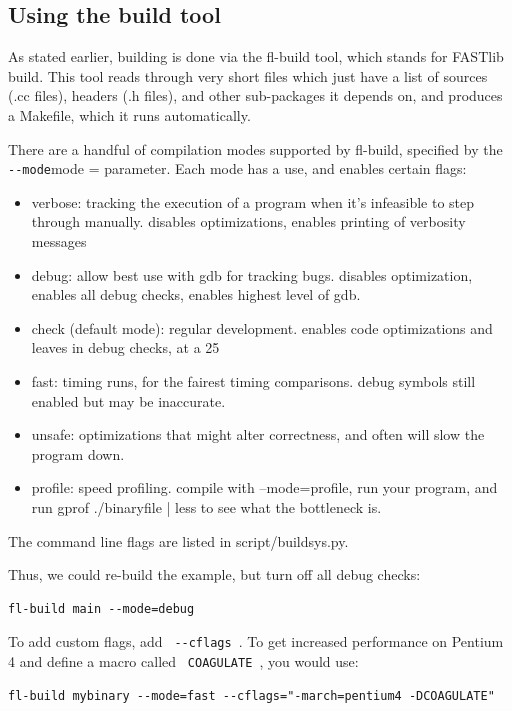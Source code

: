 \documentclass[letter]{report}
\begin{document}
\subsection {Using the build tool}

As stated earlier, building is done via the fl-build tool, which stands for FASTlib build. This tool reads through very short files which just have a list of sources (.cc files), headers (.h files), and other sub-packages it depends on, and produces a Makefile, which it runs automatically.

There are a handful of compilation modes supported by fl-build, specified by the \verb = --mode=mode = parameter. Each mode has a use, and enables certain flags:
\begin{itemize}
\item verbose: tracking the execution of a program when it's infeasible to step through manually. disables optimizations, enables printing of verbosity messages
\item debug: allow best use with gdb for tracking bugs. disables optimization, enables all debug checks, enables highest level of gdb.
\item check (default mode): regular development. enables code optimizations and leaves in debug checks, at a 25%
\item fast: timing runs, for the fairest timing comparisons. debug symbols still enabled but may be inaccurate.
\item unsafe: optimizations that might alter correctness, and often will slow the program down.
\item profile: speed profiling. compile with --mode=profile, run your program, and run gprof ./binaryfile | less to see what the bottleneck is. 
\end{itemize}
The command line flags are listed in script/buildsys.py. 

Thus, we could re-build the example, but turn off all debug checks:
\begin{verbatim}
fl-build main --mode=debug
\end{verbatim}
To add custom flags, add \verb= --cflags =. To get increased performance on Pentium 4 and define a macro called \verb= COAGULATE =, you would use:
\begin{verbatim}
fl-build mybinary --mode=fast --cflags="-march=pentium4 -DCOAGULATE"
\end{verbatim}
\end{document}
